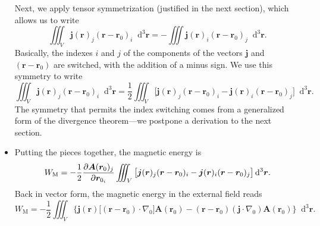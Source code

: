 \documentclass[11pt, a4paper]{article}
\newcommand{\diff}{\mathop{}\!\mathrm{d}} %
\newcommand{\dr}{\diff^{3} \r}  %
\renewcommand{\vec}[1]{\bm{#1}} %
\renewcommand{\r}{\vec{r}}
\newcommand{\A}{\vec{A}} %
\renewcommand{\j}{\vec{j}}  %
\renewcommand{\grad}{\nabla}
\begin{document}
\begin{itemize}
	
	Next, we apply tensor symmetrization (justified in the next section), which allows us to write
	\begin{equation*}
		\iiint_{V}\j(\r)_{j} (\r - \r_{0})_{i} \dr = - \iiint \j(\r)_{i}(\r - \r_{0})_{j}\dr.
	\end{equation*}
    Basically, the indexes $ i $ and $ j $ of the components of the vectors $ \j $ and $ (\r - \r_{0}) $ are switched, with the addition of a minus sign. We use this symmetry to write
	\begin{equation*}
		\iiint_{V}\j(\r)_{j} (\r - \r_{0})_{i} \dr = \frac{1}{2}\iiint_{V}  \big[\j(\r)_{j} (\r - \r_{0})_{i} - \j(\r)_{i}(\r - \r_{0})_{j}\big]\dr.
	\end{equation*}
    The symmetry that permits the index switching comes from a generalized form of the divergence theorem---we postpone a derivation to the next section.
	
	\item Putting the pieces together, the magnetic energy is
	\begin{equation*}
		W_{\text{M}} = -\frac{1}{2}\pdv{\A(\r_{0})_{j}}{\r_{0_{i}}} \iiint_{V}  \big[\j(\r)_{j} (\r - \r_{0})_{i} - \j(\r)_{i}(\r - \r_{0})_{j}\big]\dr.
	\end{equation*}
	Back in vector form, the magnetic energy in the external field reads
	\begin{equation*}
		W_{\text{M}} = - \frac{1}{2}\iiint_{V} \Big\{\j(\r) \big[ (\r - \r_{0})\cdot \grad_{0} \big ] \A(\r_{0}) - (\r - \r_{0})(\j\cdot \grad_{0})\A(\r_{0}) \Big\} \dr.
	\end{equation*}
	

\end{itemize}
\end{document}

